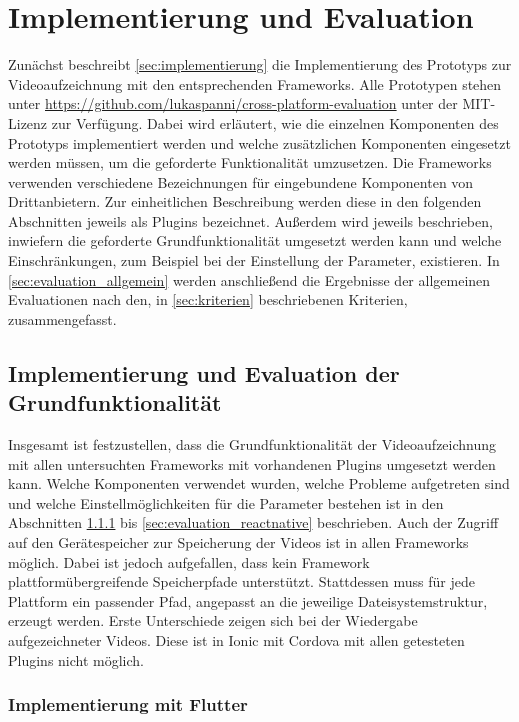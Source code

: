 \chapter{Implementierung und Evaluation}
\label{ch:evaluation}

Zunächst beschreibt \autoref{sec:implementierung} die Implementierung des Prototyps zur Videoaufzeichnung mit den entsprechenden Frameworks.
Alle Prototypen stehen unter \url{https://github.com/lukaspanni/cross-platform-evaluation} unter der MIT-Lizenz zur Verfügung.
Dabei wird erläutert, wie die einzelnen Komponenten des Prototyps implementiert werden und welche zusätzlichen Komponenten eingesetzt werden müssen, um die geforderte Funktionalität umzusetzen.
Die Frameworks verwenden verschiedene Bezeichnungen für eingebundene Komponenten von Drittanbietern.
Zur einheitlichen Beschreibung werden diese in den folgenden Abschnitten jeweils als Plugins bezeichnet.
Außerdem wird jeweils beschrieben, inwiefern die geforderte Grundfunktionalität umgesetzt werden kann und welche Einschränkungen, zum Beispiel bei der Einstellung der Parameter, existieren.
In \autoref{sec:evaluation_allgemein} werden anschließend die Ergebnisse der allgemeinen Evaluationen nach den, in \autoref{sec:kriterien} beschriebenen Kriterien, zusammengefasst.


\section{Implementierung und Evaluation der Grundfunktionalität}
\label{sec:implementierung}

Insgesamt ist festzustellen, dass die Grundfunktionalität der Videoaufzeichnung mit allen untersuchten Frameworks mit vorhandenen Plugins umgesetzt werden kann.
Welche Komponenten verwendet wurden, welche Probleme aufgetreten sind und welche Einstellmöglichkeiten für die Parameter bestehen ist in den Abschnitten \ref{sec:evaluation_flutter} bis \ref{sec:evaluation_reactnative} beschrieben.
Auch der Zugriff auf den Gerätespeicher zur Speicherung der Videos ist in allen Frameworks möglich.
Dabei ist jedoch aufgefallen, dass kein Framework plattformübergreifende Speicherpfade unterstützt.
Stattdessen muss für jede Plattform ein passender Pfad, angepasst an die jeweilige Dateisystemstruktur, erzeugt werden.
Erste Unterschiede zeigen sich bei der Wiedergabe aufgezeichneter Videos.
Diese ist in Ionic mit Cordova mit allen getesteten Plugins nicht möglich.


\subsection{Implementierung mit Flutter}
\label{sec:evaluation_flutter}


